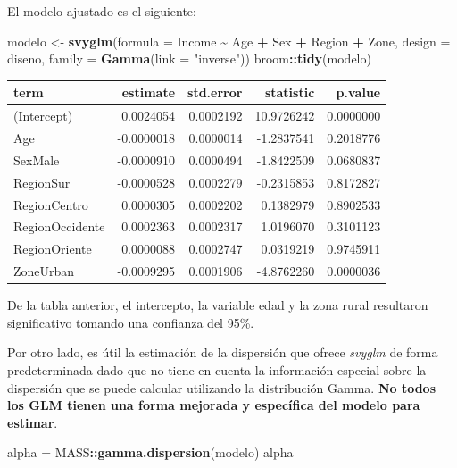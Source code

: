 \documentclass[
  12pt,
]{book}
\newenvironment{Shaded}{\begin{snugshade}}{\end{snugshade}}
\newcommand{\AttributeTok}[1]{\textcolor[rgb]{0.13,0.29,0.53}{#1}}
\newcommand{\FunctionTok}[1]{\textcolor[rgb]{0.13,0.29,0.53}{\textbf{#1}}}
\newcommand{\NormalTok}[1]{#1}
\newcommand{\OtherTok}[1]{\textcolor[rgb]{0.56,0.35,0.01}{#1}}
\newcommand{\SpecialCharTok}[1]{\textcolor[rgb]{0.81,0.36,0.00}{\textbf{#1}}}
\newcommand{\StringTok}[1]{\textcolor[rgb]{0.31,0.60,0.02}{#1}}
\begin{document}
El modelo ajustado es el siguiente:

\begin{Shaded}
\begin{Highlighting}[]
\NormalTok{modelo }\OtherTok{\textless{}{-}} \FunctionTok{svyglm}\NormalTok{(}\AttributeTok{formula =}\NormalTok{ Income }\SpecialCharTok{\textasciitilde{}}\NormalTok{ Age }\SpecialCharTok{+}\NormalTok{ Sex }\SpecialCharTok{+}
\NormalTok{                   Region }\SpecialCharTok{+}\NormalTok{ Zone,}
                   \AttributeTok{design =}\NormalTok{ diseno, }
                  \AttributeTok{family =} \FunctionTok{Gamma}\NormalTok{(}\AttributeTok{link =} \StringTok{"inverse"}\NormalTok{)) }
\NormalTok{broom}\SpecialCharTok{::}\FunctionTok{tidy}\NormalTok{(modelo)}
\end{Highlighting}
\end{Shaded}

\begin{tabular}{l|r|r|r|r}
\hline
term & estimate & std.error & statistic & p.value\\
\hline
(Intercept) & 0.0024054 & 0.0002192 & 10.9726242 & 0.0000000\\
\hline
Age & -0.0000018 & 0.0000014 & -1.2837541 & 0.2018776\\
\hline
SexMale & -0.0000910 & 0.0000494 & -1.8422509 & 0.0680837\\
\hline
RegionSur & -0.0000528 & 0.0002279 & -0.2315853 & 0.8172827\\
\hline
RegionCentro & 0.0000305 & 0.0002202 & 0.1382979 & 0.8902533\\
\hline
RegionOccidente & 0.0002363 & 0.0002317 & 1.0196070 & 0.3101123\\
\hline
RegionOriente & 0.0000088 & 0.0002747 & 0.0319219 & 0.9745911\\
\hline
ZoneUrban & -0.0009295 & 0.0001906 & -4.8762260 & 0.0000036\\
\hline
\end{tabular}

De la tabla anterior, el intercepto, la variable edad y la zona rural resultaron significativo tomando una confianza del 95\%.

Por otro lado, es útil la estimación de la dispersión que ofrece \emph{svyglm} de forma predeterminada dado que no tiene en cuenta la información especial sobre la dispersión que se puede calcular utilizando la distribución Gamma. \textbf{No todos los GLM tienen una forma mejorada y específica del modelo para estimar}.

\begin{Shaded}
\begin{Highlighting}[]
\NormalTok{alpha }\OtherTok{=}\NormalTok{ MASS}\SpecialCharTok{::}\FunctionTok{gamma.dispersion}\NormalTok{(modelo)}
\NormalTok{alpha}
\end{Highlighting}
\end{Shaded}
\end{document}
